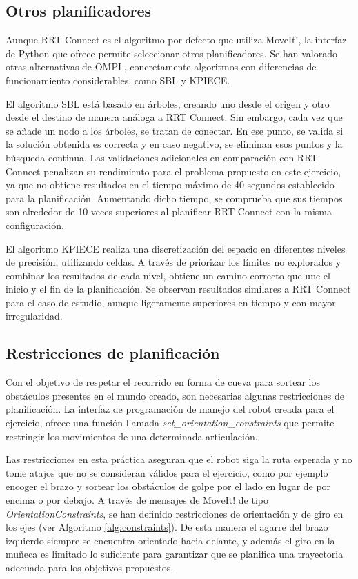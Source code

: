 \documentclass[12pt,spanish,chapterprefix, numbers=noenddot]{book}
\numberwithin{equation}{section}
\numberwithin{figure}{section}
\begin{document}
\subsection{Otros planificadores}

Aunque RRT Connect es el algoritmo por defecto que utiliza MoveIt!, la interfaz de Python que ofrece permite seleccionar otros planificadores. Se han valorado otras alternativas de OMPL, concretamente algoritmos con diferencias de funcionamiento considerables, como SBL y KPIECE. 

El algoritmo SBL está basado en árboles, creando uno desde el origen y otro desde el destino de manera análoga a RRT Connect. Sin embargo, cada vez que se añade un nodo a los árboles, se tratan de conectar. En ese punto, se valida si la solución obtenida es correcta y en caso negativo, se eliminan esos puntos y la búsqueda continua. Las validaciones adicionales en comparación con RRT Connect penalizan su rendimiento para el problema propuesto en este ejercicio, ya que no obtiene resultados en el tiempo máximo de 40 segundos establecido para la planificación. Aumentando dicho tiempo, se comprueba que sus tiempos son alrededor de 10 veces superiores al planificar RRT Connect con la misma configuración. 

El algoritmo KPIECE realiza una discretización del espacio en diferentes niveles de precisión, utilizando celdas. A través de priorizar los límites no explorados y combinar los resultados de cada nivel, obtiene un camino correcto que une el inicio y el fin de la planificación. Se observan resultados similares a RRT Connect para el caso de estudio, aunque ligeramente superiores en tiempo y con mayor irregularidad. 

\subsection{Restricciones de planificación}

Con el objetivo de respetar el recorrido en forma de cueva para sortear los obstáculos presentes en el mundo creado, son necesarias algunas restricciones de planificación. La interfaz de programación de manejo del robot creada para el ejercicio, ofrece una función llamada \textit{set\_orientation\_constraints} que permite restringir los movimientos de una determinada articulación. 

Las restricciones en esta práctica aseguran que el robot siga la ruta esperada y no tome atajos que no se consideran válidos para el ejercicio, como por ejemplo encoger el brazo y sortear los obstáculos de golpe por el lado en lugar de por encima o por debajo. 
A través de mensajes de MoveIt! de tipo \textit{OrientationConstraints}, se han definido restricciones de orientación y de giro en los ejes (ver Algoritmo \ref{alg:constraints}). De esta manera el agarre del brazo izquierdo siempre se encuentra orientado hacia delante, y además el giro en la muñeca es limitado lo suficiente para garantizar que se planifica una trayectoria adecuada para los objetivos propuestos. 
\end{document}
